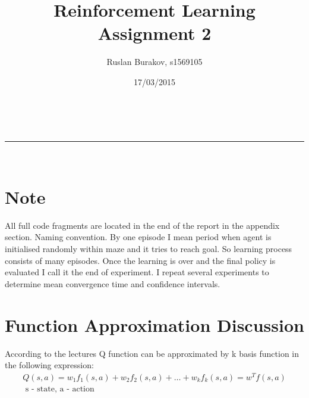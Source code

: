 \documentclass[a4paper,11pt]{article}
\makeatletter
\newcommand{\linia}{\rule{\linewidth}{0.5pt}}
\theoremstyle{mytheor}
\renewcommand{\maketitle}{
\begin{center}
\vspace{2ex}
{\huge \textsc{\@title}}
\vspace{1ex}
\\
\linia\\
\@author \hfill \@date
\vspace{4ex}
\end{center}
}
\makeatother
\begin{document}
\title{Reinforcement Learning Assignment \textnumero{} 2}

\author{Ruslan Burakov, s1569105}

\date{17/03/2015}

\maketitle
\section*{Note} 
All full code fragments are located in the end of the report in the appendix section.
Naming convention. By one episode I mean period when agent is initialised randomly within maze and it tries to reach goal. So learning process consists of many episodes. Once the learning is over and the final policy is evaluated I call it the end of experiment. I repeat several experiments to determine mean convergence time and confidence intervals.


\section{Function Approximation Discussion}
According to the lectures Q function can be approximated by k basis function in the following expression:
\begin{align}
    \label{eq:approxQ}
    Q(s,a) = w_1 f_{1}(s,a) + w_2 f_{2}(s,a) + \ldots + w_k f_{k}(s,a) = w^{T} f(s, a)
    \\
    \text{ s - state, a - action}
\end{align}
\end{document}
